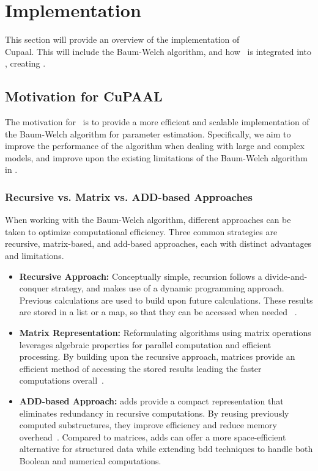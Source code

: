 \section{Implementation}\label{sec:implementation}
This section will provide an overview of the implementation of \\Cupaal.
This will include the Baum-Welch algorithm, and how \Cupaal\ is integrated into \Jajapy, creating \JajapyTwo.

\subsection{Motivation for CuPAAL}\label{subsec:motivation-for-cupaal}
The motivation for \Cupaal\ is to provide a more efficient and scalable implementation of the Baum-Welch algorithm for parameter estimation.
Specifically, we aim to improve the performance of the algorithm when dealing with large and complex models, and improve upon the existing limitations of the Baum-Welch algorithm in \Jajapy.

\subsubsection{Recursive vs. Matrix vs. ADD-based Approaches}\label{subsec:approaches}
When working with the Baum-Welch algorithm, different approaches can be taken to optimize computational efficiency.
Three common strategies are recursive, matrix-based, and \gls{add}-based approaches, each with distinct advantages and limitations.

\begin{itemize}
    \item \textbf{Recursive Approach:} Conceptually simple, recursion follows a divide-and-conquer strategy, and makes use of a dynamic programming approach. Previous calculations are used to build upon future calculations. These results are stored in a list or a map, so that they can be accessed when needed ~\cite[Chapter 4]{cormen2022introduction}.
    \item \textbf{Matrix Representation:} Reformulating algorithms using matrix operations leverages algebraic properties for parallel computation and efficient processing.
          By building upon the recursive approach, matrices provide an efficient method of accessing the stored results leading the faster computations overall~\cite[Chapter 4, 15 \& 28]{cormen2022introduction}.
    \item \textbf{ADD-based Approach:} \glspl{add} provide a compact representation that eliminates redundancy in recursive computations.
          By reusing previously computed substructures, they improve efficiency and reduce memory overhead~\cite{bahar1997algebric}.
          Compared to matrices, \glspl{add} can offer a more space-efficient alternative for structured data while extending \gls{bdd} techniques to handle both Boolean and numerical computations.
\end{itemize}

